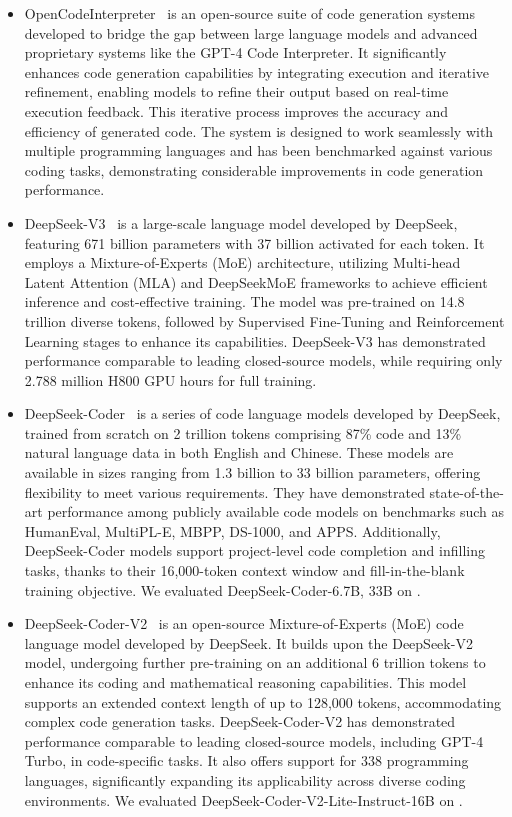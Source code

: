 \begin{itemize}[leftmargin=*]
    \item OpenCodeInterpreter~\cite{zheng2024opencodeinterpreter} is an open-source suite of code generation systems developed to bridge the gap between large language models and advanced proprietary systems like the GPT-4 Code Interpreter. It significantly enhances code generation capabilities by integrating execution and iterative refinement, enabling models to refine their output based on real-time execution feedback. This iterative process improves the accuracy and efficiency of generated code. The system is designed to work seamlessly with multiple programming languages and has been benchmarked against various coding tasks, demonstrating considerable improvements in code generation performance.
    
    \item DeepSeek-V3~\cite{liu2024deepseek} is a large-scale language model developed by DeepSeek, featuring 671 billion parameters with 37 billion activated for each token. It employs a Mixture-of-Experts (MoE) architecture, utilizing Multi-head Latent Attention (MLA) and DeepSeekMoE frameworks to achieve efficient inference and cost-effective training. The model was pre-trained on 14.8 trillion diverse tokens, followed by Supervised Fine-Tuning and Reinforcement Learning stages to enhance its capabilities. DeepSeek-V3 has demonstrated performance comparable to leading closed-source models, while requiring only 2.788 million H800 GPU hours for full training.
        
    \item DeepSeek-Coder~\cite{deepseekcoder} is a series of code language models developed by DeepSeek, trained from scratch on 2 trillion tokens comprising 87\% code and 13\% natural language data in both English and Chinese. These models are available in sizes ranging from 1.3 billion to 33 billion parameters, offering flexibility to meet various requirements. They have demonstrated state-of-the-art performance among publicly available code models on benchmarks such as HumanEval, MultiPL-E, MBPP, DS-1000, and APPS. Additionally, DeepSeek-Coder models support project-level code completion and infilling tasks, thanks to their 16,000-token context window and fill-in-the-blank training objective. We evaluated DeepSeek-Coder-{6.7B, 33B} on \mytitle.

    \item DeepSeek-Coder-V2~\cite{deepseekcoderv2} is an open-source Mixture-of-Experts (MoE) code language model developed by DeepSeek. It builds upon the DeepSeek-V2 model, undergoing further pre-training on an additional 6 trillion tokens to enhance its coding and mathematical reasoning capabilities. This model supports an extended context length of up to 128,000 tokens, accommodating complex code generation tasks. DeepSeek-Coder-V2 has demonstrated performance comparable to leading closed-source models, including GPT-4 Turbo, in code-specific tasks. It also offers support for 338 programming languages, significantly expanding its applicability across diverse coding environments. We evaluated DeepSeek-Coder-V2-Lite-Instruct-{16B} on \mytitle.

\end{itemize}


